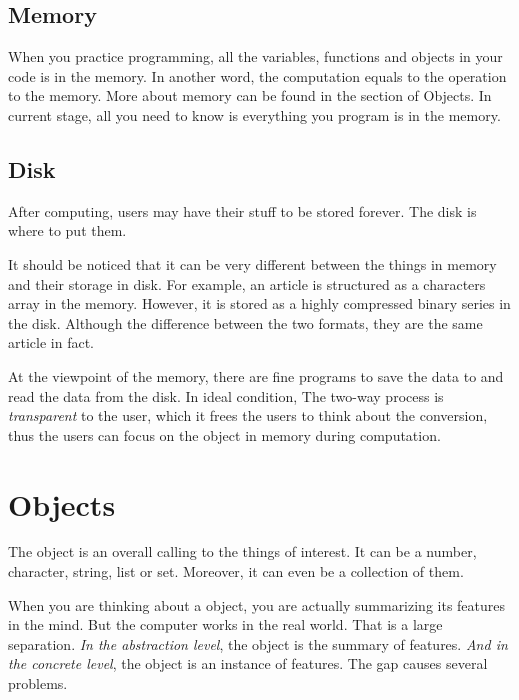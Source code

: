 

\subsection{Memory}

When you practice programming,
all the variables, functions and objects in your code is in the memory.
In another word,
the computation equals to the operation to the memory.
More about memory can be found in the section of Objects.
In current stage,
all you need to know is everything you program is in the memory.

\subsection{Disk}

After computing,
users may have their stuff to be stored forever.
The disk is where to put them.

It should be noticed that it can be very different between the things in memory and their storage in disk.
For example, an article is structured as a characters array in the memory.
However, it is stored as a highly compressed binary series in the disk.
Although the difference between the two formats,
they are the same article in fact.

At the viewpoint of the memory,
there are fine programs to save the data to and read the data from the disk.
In ideal condition,
The two-way process is \emph{transparent} to the user,
which it frees the users to think about the conversion,
thus the users can focus on the object in memory during computation.

\section{Objects}

The object is an overall calling to the things of interest.
It can be a number, character, string, list or set.
Moreover, it can even be a collection of them.

When you are thinking about a object,
you are actually summarizing its features in the mind.
But the computer works in the real world.
That is a large separation.
\emph{In the abstraction level},
the object is the summary of features.
\emph{And in the concrete level},
the object is an instance of features.
The gap causes several problems.

